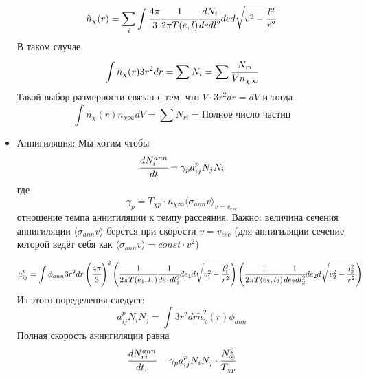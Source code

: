 \begin{itemize}
		\begin{equation*}
			\tilde{n}_{\chi}(r) = \sum_i{\int{\cfrac{4\pi}{3} \cfrac{1}{2\pi T(e,l)} \cfrac{dN_i}{dedl^2} de d\sqrt{v^2-\frac{l^2}{r^2}} }}
		\end{equation*}
		 В таком случае
		 \begin{equation*}
		 	\int{\tilde{n}_{\chi}(r) 3r^2dr} = \sum{N_i} = \sum{\cfrac{N_{ri}}{V n_{\chi \infty}}}
		 \end{equation*}
		 Такой выбор размерности связан с тем, что $V \cdot 3r^2dr = dV$ и тогда
		 \begin{equation*}
		 	\int{\tilde{n}_{\chi}(r) n_{\chi \infty} dV} = \sum{N_{ri}} = \text{Полное число частиц}
		 \end{equation*}
		\item Аннигиляция:
		Мы хотим чтобы
		\begin{equation}
			\cfrac{d N_{i}^{ann}}{dt} = \gamma_p a^{p}_{ij} N_j N_i
		\end{equation}
		где 
		\begin{equation*}
			\gamma_p = T_{\chi p} \cdot n_{\chi \infty} \langle\sigma_{ann} v\rangle_{v = v_{esc}}
		\end{equation*}
		отношение темпа аннигиляции к темпу рассеяния. Важно: величина сечения аннигиляции $\langle\sigma_{ann} v\rangle$ берётся при скорости $v = v_{esc}$ (для аннигиляции сечение которой ведёт себя как $\langle\sigma_{ann} v\rangle = const\cdot v^2$)
		
		\begin{equation*}
			a_{ij}^p = \int{\phi_{ann} 3r^2dr\left(\cfrac{4\pi}{3}\right)^2 \left( \cfrac{1}{2\pi T(e_1,l_1)} \cfrac{1}{de_1dl_1^2} de_1 d\sqrt{v_1^2-\frac{l_1^2}{r^2}} \right) \left( \cfrac{1}{2\pi T(e_2,l_2)} \cfrac{1}{de_2dl_2^2} de_2 d\sqrt{v_2^2-\frac{l_2^2}{r^2}} \right)}
		\end{equation*}
		Из этого поределения следует:
		\begin{equation*}
			a_{ij}^p N_i N_j = \int{3r^2dr \tilde{n}^2_{\chi}(r) \phi_{ann}}
		\end{equation*}
		Полная скорость аннигиляции равна
		\begin{equation*}
			\cfrac{dN^{ann}_{ri}}{dt_r} = \gamma_p a_{ij}^p N_i N_j \cdot \cfrac{N^2_{\odot}}{T_{\chi p}}
		\end{equation*}
		
	\end{itemize}
 
	
	
